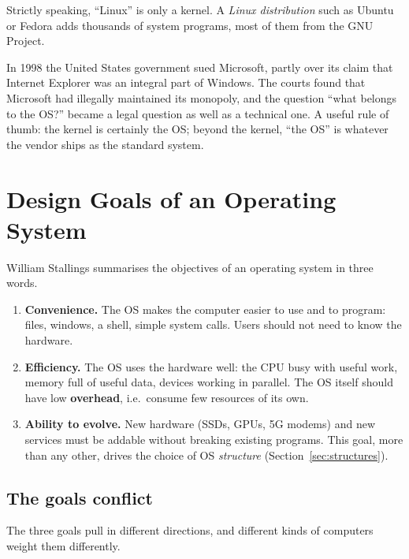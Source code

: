 \documentclass[11pt,a4paper]{article}
\newcommand{\term}[1]{\textbf{\color{mintdeep}#1}}
\begin{document}
Strictly speaking, ``Linux'' is only a kernel. A \emph{Linux distribution} such as Ubuntu or Fedora adds thousands of system programs, most of them from the GNU Project.

\begin{histnote}
In 1998 the United States government sued Microsoft, partly over its claim that Internet Explorer was an integral part of Windows. The courts found that Microsoft had illegally maintained its monopoly, and the question ``what belongs to the OS?'' became a legal question as well as a technical one. A useful rule of thumb: the kernel is certainly the OS; beyond the kernel, ``the OS'' is whatever the vendor ships as the standard system.
\end{histnote}

\section{Design Goals of an Operating System}

William Stallings summarises the objectives of an operating system in three words.

\begin{enumerate}[leftmargin=1.4em]
  \item \textbf{Convenience.} The OS makes the computer easier to use and to program: files, windows, a shell, simple system calls. Users should not need to know the hardware.
  \item \textbf{Efficiency.} The OS uses the hardware well: the CPU busy with useful work, memory full of useful data, devices working in parallel. The OS itself should have low \term{overhead}, i.e.\ consume few resources of its own.
  \item \textbf{Ability to evolve.} New hardware (SSDs, GPUs, 5G modems) and new services must be addable without breaking existing programs. This goal, more than any other, drives the choice of OS \emph{structure} (Section~\ref{sec:structures}).
\end{enumerate}

\subsection{The goals conflict}

The three goals pull in different directions, and different kinds of computers weight them differently.
\end{document}
